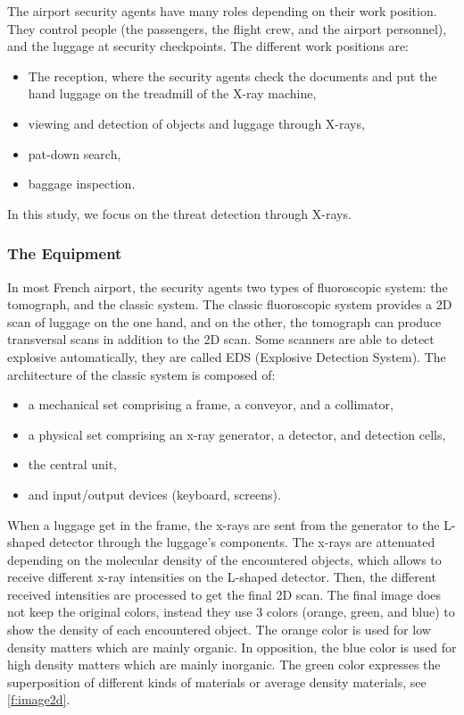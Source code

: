 The airport security agents have many roles depending on their work position. They control people (the passengers, the flight crew, and the airport personnel), and the luggage at security checkpoints. The different work positions are:
\begin{itemize}
\item The reception, where the security agents check the documents and put the hand luggage on the treadmill of the X-ray machine,
\item viewing and detection of objects and luggage through X-rays,
\item pat-down search,
\item baggage inspection.
\end{itemize}
In this study, we focus on the threat detection through X-rays.

\subsubsection{The Equipment}

In most French airport, the security agents two types of fluoroscopic system: the tomograph, and the classic system. The classic fluoroscopic system provides a 2D scan of luggage on the one hand, and on the other, the tomograph can produce transversal scans in addition to the 2D scan. Some scanners are able to detect explosive automatically, they are called EDS (Explosive Detection System). The architecture of the classic system is composed of:
\begin{itemize}
\item a mechanical set comprising a frame, a conveyor, and a collimator,
\item a physical set comprising an x-ray generator, a detector, and detection cells,
\item the central unit,
\item and input/output devices (keyboard, screens).
\end{itemize}
When a luggage get in the frame, the x-rays are sent from the generator to the L-shaped detector through the luggage's components. The x-rays are attenuated depending on the molecular density of the encountered objects, which allows to receive different x-ray intensities on the L-shaped detector. Then, the different received intensities are processed to get the final 2D scan.
The final image does not keep the original colors, instead they use 3 colors (orange, green, and blue) to show the density of each encountered object. The orange color is used for low density matters which are mainly organic. In opposition, the blue color is used for high density matters which are mainly inorganic. The green color expresses the superposition of different kinds of materials or average density materials, see \autoref{f:image2d}.

